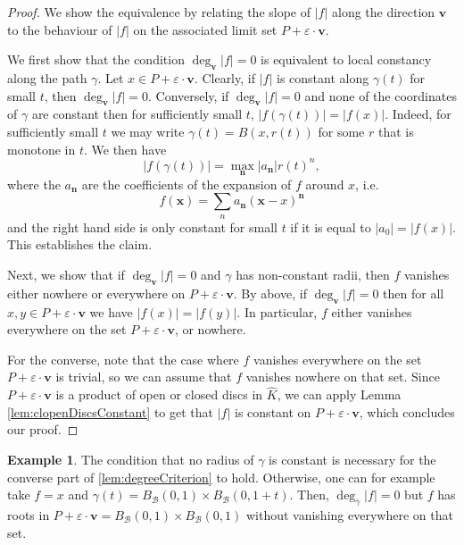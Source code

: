\documentclass[10pt]{article}
\theoremstyle{definition}
\newtheorem{example}[theorem]{Example}
\renewcommand{\vec}[1]{\mathbf{#1}}
\begin{document}
\begin{proof}

We show the equivalence by relating the slope of $|f|$ along the direction $\vec{v}$ to the behaviour of $|f|$ on the associated limit set $P + \varepsilon \cdot \mathbf{v}$.

    We first show that the condition $\deg_{\vec{v}} \lvert f \rvert  = 0$ is equivalent to local constancy along the path $\gamma$. Let $x \in P + \varepsilon \cdot \mathbf{v}$. Clearly, if $\lvert f \rvert$ is constant along $\gamma(t)$ for small $t$, then $\deg_\mathbf{v} \lvert f \rvert  = 0$.
    Conversely, if $\deg_\vec{v} \lvert f \rvert  = 0$ and none of the coordinates of $\gamma$ are constant then for sufficiently small $t$, $\lvert f(\gamma(t)) \rvert = \lvert f(x) \rvert$. Indeed, for sufficiently small $t$ we may write $\gamma(t) = B(x, r(t))$ for some $r$ that is monotone in $t$. We then have
    $$
    \lvert f(\gamma(t)) \rvert = \max_{\vec{n}} \lvert a_\vec{n} \rvert r(t) ^ n, 
    $$
    where the $a_\mathbf{n}$ are the coefficients of the expansion of $f$ around $x$, i.e.
    $$
    f(\mathbf x) = \sum_n a_\mathbf{n} (\mathbf x - x)^ \mathbf n
    $$
    and the right hand side is only constant for small $t$ if it is equal to $\lvert a_0 \rvert = \lvert f(x) \rvert$. This establishes the claim.
    
    Next, we show that if $\deg_{\vec{v}} \lvert f \rvert =0$ and $\gamma$ has non-constant radii, then $f$ vanishes either nowhere or everywhere on $P + \varepsilon \cdot \mathbf{v}$. By above, if $\deg_\vec{v} \lvert f \rvert  = 0$ then for all $x, y \in P + \varepsilon \cdot \mathbf{v}$ we have $\lvert f(x) \rvert = \lvert f(y) \rvert$. In particular, $f$ either vanishes everywhere on the set $P + \varepsilon \cdot \mathbf{v}$, or nowhere.

    For the converse, note that the case where $f$ vanishes everywhere on the set $P + \varepsilon \cdot \mathbf{v}$ is trivial, so we can assume that $f$ vanishes nowhere on that set. Since $P + \varepsilon \cdot \mathbf{v}$ is a product of open or closed discs in $\hat{K}$, we can apply Lemma \ref{lem:clopenDiscsConstant} to get that $\lvert f \rvert$ is constant on $P + \varepsilon \cdot \mathbf{v}$, which concludes our proof.
\end{proof}

\begin{example}
    The condition that no radius of $\gamma$ is constant is necessary for the converse part of \cref{lem:degreeCriterion} to hold. Otherwise, one can for example take $f = x$ and $\gamma(t) = B_\mathcal{B}(0, 1) \times B_\mathcal{B}(0, 1 + t)$. Then, $\deg_{\overline \gamma} \lvert f \rvert  = 0$ but $f$ has roots in $P + \varepsilon \cdot \vec v = B_\mathcal B(0, 1) \times B_\mathcal B(0, 1)$ without vanishing everywhere on that set.
\end{example}
\end{document}
